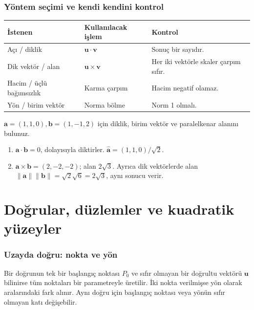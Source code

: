 \section{Yöntem seçimi ve kendi kendini kontrol}
\begin{center}\small\renewcommand{\arraystretch}{1.35}\begin{tabularx}{\linewidth}{>{\raggedright\arraybackslash}X >{\raggedright\arraybackslash}X >{\raggedright\arraybackslash}X}\toprule
\textbf{İstenen} & \textbf{Kullanılacak işlem} & \textbf{Kontrol}\\\midrule
Açı / diklik & \(\mathbf u\cdot\mathbf v\) & Sonuç bir sayıdır.\\
Dik vektör / alan & \(\mathbf u\times\mathbf v\) & Her iki vektörle skaler çarpım sıfır.\\
Hacim / üçlü bağımsızlık & Karma çarpım & Hacim negatif olamaz.\\
Yön / birim vektör & Norma bölme & Norm 1 olmalı.\\
\bottomrule\end{tabularx}\end{center}
\begin{tcolorbox}[title={Örnek 1.8 | Pekiştirme},colframe=accent]\(\mathbf a=(1,1,0),\mathbf b=(1,-1,2)\) için diklik, birim vektör ve paralelkenar alanını bulunuz.
\par\vspace{1mm}{\scriptsize\sffamily Pekiştirme}\end{tcolorbox}
\begin{tcolorbox}[title={Adım adım çözüm},colback=green!3!white,colframe=green]\begin{enumerate}
\item \(\mathbf a\cdot\mathbf b=0\), dolayısıyla diktirler. \(\widehat{\mathbf a}=(1,1,0)/\sqrt2\).
\item \(\mathbf a\times\mathbf b=(2,-2,-2)\); alan \(2\sqrt3\). Ayrıca dik vektörlerde alan \(\|\mathbf a\|\|\mathbf b\|=\sqrt2\sqrt6=2\sqrt3\), aynı sonucu verir.
\end{enumerate}\end{tcolorbox}
\clearpage\part{Doğrular, düzlemler ve kuadratik yüzeyler}
\section{Uzayda doğru: nokta ve yön}
Bir doğrunun tek bir başlangıç noktası \(P_0\) ve sıfır olmayan bir doğrultu vektörü \(\mathbf u\) bilinirse tüm noktaları bir parametreyle üretilir. İki nokta verilmişse yön olarak aralarındaki fark alınır. Aynı doğru için başlangıç noktası veya yönün sıfır olmayan katı değişebilir.


